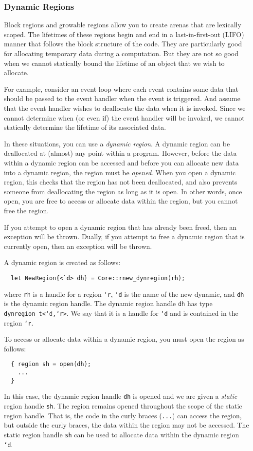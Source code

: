 \subsubsection*{Dynamic Regions}

Block regions and growable regions allow you to create arenas that
are lexically scoped.  The lifetimes of these regions begin and end
in a last-in-first-out (LIFO) manner that follows the block structure
of the code.  They are particularly good for allocating temporary
data during a computation.  But they are not so good when we cannot
statically bound the lifetime of an object that we wish to allocate.

For example, consider an event loop where each event contains some
data that should be passed to the event handler when the event is
triggered.  And assume that the event handler wishes to deallocate
the data when it is invoked.  Since we cannot determine when (or even
if) the event handler will be invoked, we cannot statically determine
the lifetime of its associated data.

In these situations, you can use a \emph{dynamic region}.  A dynamic
region can be deallocated at (almost) any point within a program.
However, before the data within a dynamic region can be accessed
and before you can allocate new data into a dynamic region, the
region must be \emph{opened}.  When you open a dynamic region, this
checks that the region has not been deallocated, and also prevents
someone from deallocating the region as long as it is open.  In
other words, once open, you are free to access or allocate data 
within the region, but you cannot free the region.  

If you attempt to open a dynamic region that has already been freed, then
an exception will be thrown.  Dually, if you attempt to free a
dynamic region that is currently open, then an exception will be
thrown.  

A dynamic region is created as follows:
\begin{verbatim}
  let NewRegion{<`d> dh} = Core::rnew_dynregion(rh);
\end{verbatim}
where \texttt{rh} is a handle for a region \texttt{`r}, \texttt{`d} is
the name of the new dynamic, and \texttt{dh} is the dynamic region handle.
The dynamic region handle \texttt{dh} has type \texttt{dynregion_t<`d,`r>}.
We say that it is a handle for \texttt{`d} and is contained in the
region \texttt{`r}.

To access or allocate data within a dynamic region, you must
open the region as follows:
\begin{verbatim}
  { region sh = open(dh);
    ...
  }
\end{verbatim}
In this case, the dynamic region handle \texttt{dh} is opened and we
are given a \emph{static} region handle \texttt{sh}.  The region
remains opened throughout the scope of the static region handle.
That is, the code in the curly braces (\texttt{...}) can access
the region, but outside the curly braces, the data within the
region may not be accessed.  The static region
handle \texttt{sh} can be used to allocate data within the dynamic 
region \texttt{`d}.

